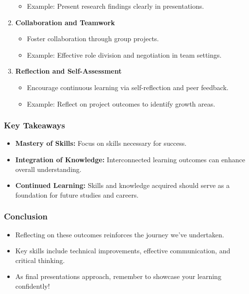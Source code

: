 \documentclass[aspectratio=169]{beamer}
\begin{document}
\begin{frame}[fragile]
\begin{enumerate}
\begin{itemize}
                \item Example: Present research findings clearly in presentations.
            \end{itemize}
        \item \textbf{Collaboration and Teamwork}
            \begin{itemize}
                \item Foster collaboration through group projects.
                \item Example: Effective role division and negotiation in team settings.
            \end{itemize}
        \item \textbf{Reflection and Self-Assessment}
            \begin{itemize}
                \item Encourage continuous learning via self-reflection and peer feedback.
                \item Example: Reflect on project outcomes to identify growth areas.
            \end{itemize}
    \end{enumerate}
\end{frame}

\begin{frame}[fragile]
    \frametitle{Key Takeaways}
    \begin{itemize}
        \item \textbf{Mastery of Skills:} Focus on skills necessary for success.
        \item \textbf{Integration of Knowledge:} Interconnected learning outcomes can enhance overall understanding.
        \item \textbf{Continued Learning:} Skills and knowledge acquired should serve as a foundation for future studies and careers.
    \end{itemize}
\end{frame}

\begin{frame}[fragile]
    \frametitle{Conclusion}
    \begin{itemize}
        \item Reflecting on these outcomes reinforces the journey we've undertaken.
        \item Key skills include technical improvements, effective communication, and critical thinking.
        \item As final presentations approach, remember to showcase your learning confidently!
    \end{itemize}
\end{frame}
\end{document}
